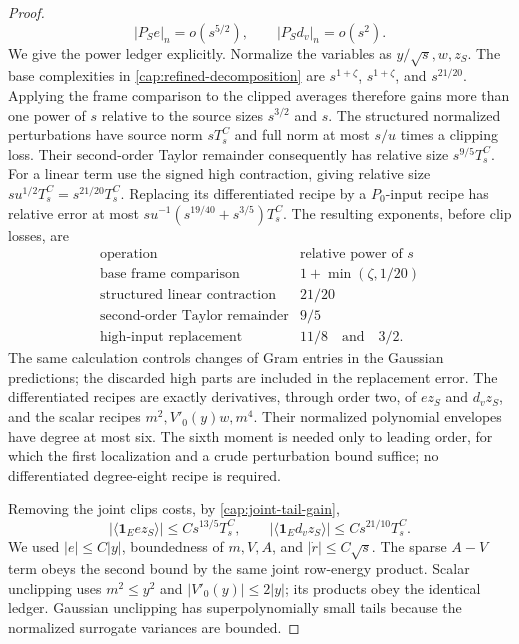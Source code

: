 \begin{proof}
\begin{equation}\label{cap:low-source-cancellation}
 |P_Se|_n=o(s^{5/2}),\qquad |P_Sd_v|_n=o(s^2).
\end{equation}
We give the power ledger explicitly. Normalize the variables as $y/\sqrt
s,w,z_S$. The base complexities in \eqref{cap:refined-decomposition} are
$s^{1+\zeta}$, $s^{1+\zeta}$, and $s^{21/20}$. Applying the frame comparison
to the clipped averages therefore gains more than one power of $s$ relative to
the source sizes $s^{3/2}$ and $s$. The structured normalized perturbations
have source norm $sT_s^C$ and full norm at most $s/u$ times a clipping loss.
Their second-order Taylor remainder consequently has relative size
$s^{9/5}T_s^C$. For a linear term use the signed high contraction, giving
relative size $su^{1/2}T_s^C=s^{21/20}T_s^C$. Replacing its differentiated
recipe by a $P_0$-input recipe has relative error at most
$su^{-1}(s^{19/40}+s^{3/5})T_s^C$. The resulting exponents, before clip
losses, are
\begin{equation}\label{cap:boundary-power-ledger}
 \begin{array}{c|c}
 \text{operation}&\text{relative power of }s\\ \hline
 \text{base frame comparison}&1+\min(\zeta,1/20)\\
 \text{structured linear contraction}&21/20\\
 \text{second-order Taylor remainder}&9/5\\
 \text{high-input replacement}&11/8\quad\text{and}\quad3/2.
 \end{array}
\end{equation}
The same calculation controls changes of Gram entries in the Gaussian
predictions; the discarded high parts are included in the replacement error.
The differentiated recipes are exactly derivatives, through order two, of $e
z_S$ and $d_v z_S$, and the scalar recipes $m^2,V'_0(y)w,m^4$. Their
normalized polynomial envelopes have degree at most six. The sixth moment is
needed only to leading order, for which the first localization and a crude
perturbation bound suffice; no differentiated degree-eight recipe is required.

Removing the joint clips costs, by
\eqref{cap:joint-tail-gain},
\[
 |\langle\mathbf1_Ee z_S\rangle|
      \le Cs^{13/5}T_s^C,\qquad
 |\langle\mathbf1_Ed_v z_S\rangle|
      \le Cs^{21/10}T_s^C.
\]
We used $|e|\le C|y|$, boundedness of $m,V,A$, and $|\dot r|\le C\sqrt s$. The
sparse $A-V$ term obeys the second bound by the same joint row-energy product.
Scalar unclipping uses $m^2\le y^2$ and $|V'_0(y)|\le2|y|$; its products obey
the identical ledger. Gaussian unclipping has superpolynomially small tails
because the normalized surrogate variances are bounded.


\end{proof}
